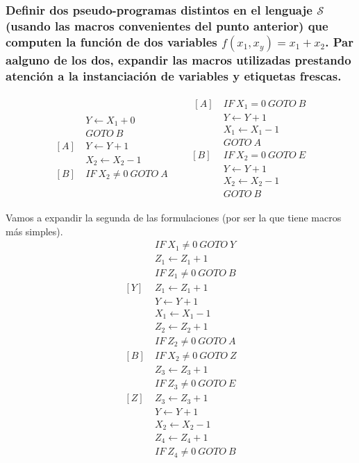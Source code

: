 \documentclass[fleqn, 11pt]{article}
\newcommand{\Scur}{\mathcal{S}}
\newcommand{\into}{\leftarrow}
\begin{document}
\subsubsection{Definir dos pseudo-programas distintos en el lenguaje $\Scur$
(usando las macros convenientes del punto anterior) que computen la función de
dos variables $f(x_1, x_y) = x_1 + x_2$. Par aalguno de los dos, expandir las
macros utilizadas prestando atención a la instanciación de variables y
etiquetas frescas.}

\begin{align*}
	\begin{aligned}
		     &Y   \into X_1 + 0 \\
		     &GOTO\ B \\
		[A]\ &Y   \into Y   + 1 \\
		     &X_2 \into X_2 - 1 \\
		[B]\ &IF\ X_2 \neq 0\ GOTO\ A
	\end{aligned}
	&&
	\begin{aligned}\
		[A]\ &IF\ X_1 = 0\ GOTO\ B \\
		     &Y   \into Y   + 1 \\
		     &X_1 \into X_1 - 1 \\
		     &GOTO\ A \\
		[B]\ &IF\ X_2 = 0\ GOTO\ E \\
		     &Y   \into Y   + 1 \\
		     &X_2 \into X_2 - 1 \\
		     &GOTO\ B
	\end{aligned}
\end{align*}

Vamos a expandir la segunda de las formulaciones (por ser la que tiene macros
más simples).
\begin{align*}
	[A]\ &IF\ X_1 \neq 0\ GOTO\ Y \\
	     &Z_1 \into Z_1 + 1 \\
	     &IF\ Z_1 \neq 0\ GOTO\ B \\
	[Y]\ &Z_1 \into Z_1 + 1 \\
	     &Y   \into Y   + 1 \\
	     &X_1 \into X_1 - 1 \\
	     &Z_2 \into Z_2 + 1 \\
	     &IF\ Z_2 \neq 0\ GOTO\ A \\
	[B]\ &IF\ X_2 \neq 0\ GOTO\ Z \\
	     &Z_3 \into Z_3 + 1 \\
	     &IF\ Z_3 \neq 0\ GOTO\ E \\
	[Z]\ &Z_3 \into Z_3 + 1 \\
	     &Y   \into Y   + 1 \\
	     &X_2 \into X_2 - 1 \\
	     &Z_4 \into Z_4 + 1 \\
	     &IF\ Z_4 \neq 0\ GOTO\ B \\
\end{align*}
\end{document}
